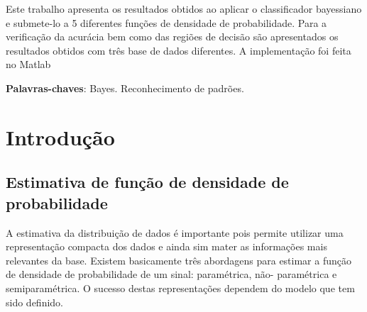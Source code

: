 \documentclass[ 
	article,			%
	11pt,				%
	oneside,			%
	a4paper,			%
	english,			%
	brazil,				%
	]{abntex2}
\begin{document}
\frenchspacing 


%
%
\maketitle

\begin{resumoumacoluna}
 Este trabalho apresenta os resultados obtidos ao aplicar o classificador
 bayessiano e submete-lo a 5 diferentes funções de densidade de probabilidade.
 Para a verificação da acurácia bem como das regiões de decisão são
 apresentados os resultados obtidos com três base de dados diferentes.
 A implementação foi feita no Matlab\texttrademark
 
 
 \vspace{\onelineskip}
 
 \noindent
 \textbf{Palavras-chaves}: Bayes. Reconhecimento de padrões.
\end{resumoumacoluna}


\textual

\section*{Introdução}


\subsection{Estimativa de função de densidade de probabilidade}
A estimativa da distribuição de dados é importante pois permite utilizar uma
representação compacta dos dados e ainda sim mater as informações mais
relevantes da base. Existem basicamente três abordagens para estimar a função de
densidade de probabilidade de um sinal: paramétrica, não- paramétrica e
semiparamétrica. O sucesso destas representações dependem do modelo que tem sido definido.
\end{document}
